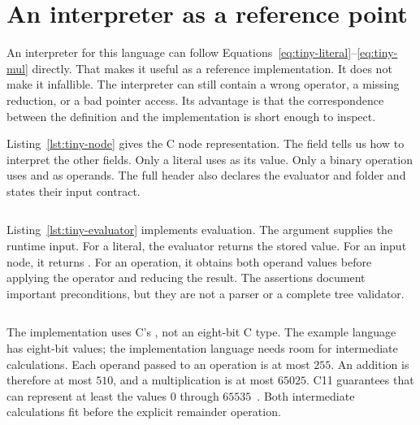 \section{An interpreter as a reference point}
\label{sec:tiny-reference-interpreter}

An interpreter for this language can follow Equations~\ref{eq:tiny-literal}--\ref{eq:tiny-mul} directly.
That makes it useful as a reference implementation.
It does not make it infallible.
The interpreter can still contain a wrong operator, a missing reduction, or a bad pointer access.
Its advantage is that the correspondence between the definition and the implementation is short enough to inspect.

Listing~\ref{lst:tiny-node} gives the C node representation.
The field  tells us how to interpret the other fields.
Only a literal uses  as its value.
Only a binary operation uses  and  as operands.
The full header also declares the evaluator and folder and states their input contract.

\begin{listing}
  \inputminted[firstline=5,lastline=12]{c}{example-code/ch01/expr.h}
  \caption{A tagged node represents one expression form.}
  \label{lst:tiny-node}
\end{listing}

Listing~\ref{lst:tiny-evaluator} implements evaluation.
The argument  supplies the runtime input.
For a literal, the evaluator returns the stored value.
For an input node, it returns .
For an operation, it obtains both operand values before applying the operator and reducing the result.
The assertions document important preconditions, but they are not a parser or a complete tree validator.

\begin{listing}
  \inputminted[firstline=5,lastline=20]{c}{example-code/ch01/expr.c}
  \caption{The evaluator implements the four semantic equations.}
  \label{lst:tiny-evaluator}
\end{listing}

The implementation uses C's , not an eight-bit C type.
The example language has eight-bit values; the implementation language needs room for intermediate calculations.
Each operand passed to an operation is at most $255$.
An addition is therefore at most $510$, and a multiplication is at most $65025$.
C11 guarantees that  can represent at least the values $0$ through $65535$~\cite[Section~5.2.4.2.1]{wg14-2011-c11}.
Both intermediate calculations fit before the explicit remainder operation.

